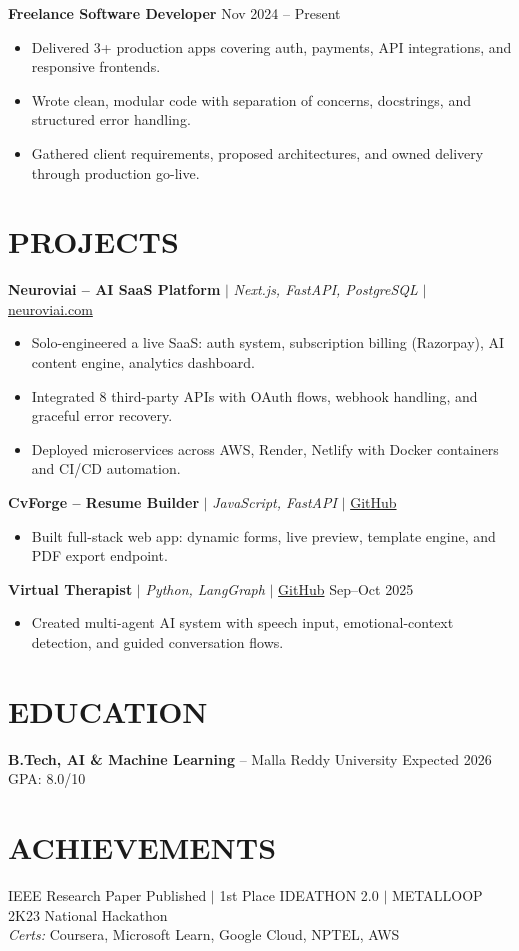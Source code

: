 \documentclass[10pt]{article}
\begin{document}
\textbf{Freelance Software Developer} \hfill Nov 2024 -- Present
\begin{itemize}
\item Delivered 3+ production apps covering auth, payments, API integrations, and responsive frontends.
\item Wrote clean, modular code with separation of concerns, docstrings, and structured error handling.
\item Gathered client requirements, proposed architectures, and owned delivery through production go-live.
\end{itemize}

\section*{PROJECTS}
\textbf{Neuroviai -- AI SaaS Platform} $|$ \textit{Next.js, FastAPI, PostgreSQL} $|$ \href{https://neuroviai.com}{neuroviai.com}
\begin{itemize}
\item Solo-engineered a live SaaS: auth system, subscription billing (Razorpay), AI content engine, analytics dashboard.
\item Integrated 8 third-party APIs with OAuth flows, webhook handling, and graceful error recovery.
\item Deployed microservices across AWS, Render, Netlify with Docker containers and CI/CD automation.
\end{itemize}

\textbf{CvForge -- Resume Builder} $|$ \textit{JavaScript, FastAPI} $|$ \href{https://github.com/JeetInTech/CvForge-Online}{GitHub}
\begin{itemize}
\item Built full-stack web app: dynamic forms, live preview, template engine, and PDF export endpoint.
\end{itemize}

\textbf{Virtual Therapist} $|$ \textit{Python, LangGraph} $|$ \href{https://github.com/JeetInTech/Virtual-Therapist---LangGraph-Agentic-AI-System}{GitHub} \hfill Sep--Oct 2025
\begin{itemize}
\item Created multi-agent AI system with speech input, emotional-context detection, and guided conversation flows.
\end{itemize}

\section*{EDUCATION}
\textbf{B.Tech, AI \& Machine Learning} -- Malla Reddy University \hfill Expected 2026 \hfill GPA: 8.0/10

\section*{ACHIEVEMENTS}
IEEE Research Paper Published $|$ 1st Place IDEATHON 2.0 $|$ METALLOOP 2K23 National Hackathon \\
\textit{Certs:} Coursera, Microsoft Learn, Google Cloud, NPTEL, AWS
\end{document}
